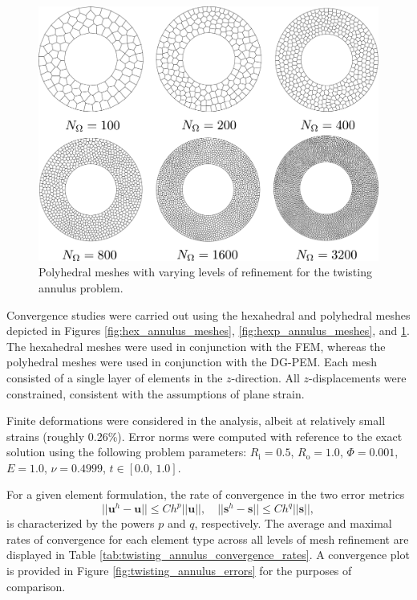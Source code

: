 \begin{figure}[!h]
  \centering
  \includegraphics[width=5.0in]{figures/poly_annulus_meshes.pdf}
  \caption{Polyhedral meshes with varying levels of refinement for the twisting annulus problem.}
  \label{fig:poly_annulus_meshes}
\end{figure}

Convergence studies were carried out using the hexahedral and polyhedral meshes depicted in Figures \ref{fig:hex_annulus_meshes}, \ref{fig:hexp_annulus_meshes}, and \ref{fig:poly_annulus_meshes}. The hexahedral meshes were used in conjunction with the FEM, whereas the polyhedral meshes were used in conjunction with the DG-PEM. Each mesh consisted of a single layer of elements in the $z$-direction. All $z$-displacements were constrained, consistent with the assumptions of plane strain.

Finite deformations were considered in the analysis, albeit at relatively small strains (roughly 0.26\%). Error norms were computed with reference to the exact solution using the following problem parameters: $R_{\mathrm i} = 0.5$, $R_{\mathrm o} = 1.0$, $\Phi = 0.001$, $E = 1.0$, $\nu = 0.4999$, $t \in [0.0, \, 1.0]$.

For a given element formulation, the rate of convergence in the two error metrics
\begin{equation}
	|| \bm{u}^h - \bm{u} || \leq C h^p || \bm{u} ||, \quad || \bm{s}^h - \bm{s} || \leq C h^q || \bm{s} ||,
\end{equation}
is characterized by the powers $p$ and $q$, respectively. The average and maximal rates of convergence for each element type across all levels of mesh refinement are displayed in Table \ref{tab:twisting_annulus_convergence_rates}. A convergence plot is provided in Figure \ref{fig:twisting_annulus_errors} for the purposes of comparison.

